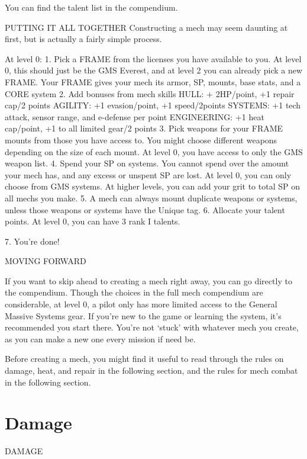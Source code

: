 You can find the talent list in the compendium.


                                   PUTTING IT ALL TOGETHER
Constructing a mech may seem daunting at first, but is actually a fairly simple process.

At level 0:
     1.  Pick a FRAME from the licenses you have available to you. At level 0, this should just be
         the GMS Everest, and at level 2 you can already pick a new FRAME. Your FRAME gives
         your mech its armor, SP, mounts, base stats, and a CORE system
    2.   Add bonuses from mech skills
                 HULL: + 2HP/point, +1 repair cap/2 points
                 AGILITY: +1 evasion/point, +1 speed/2points
                 SYSTEMS: +1 tech attack, sensor range, and e-defense per point
                 ENGINEERING: +1 heat cap/point, +1 to all limited gear/2 points
    3.   Pick weapons for your FRAME mounts from those you have access to. You might choose
         different weapons depending on the size of each mount. At level 0, you have access to
         only the GMS weapon list.
    4.   Spend your SP on systems. You cannot spend over the amount your mech has, and any
         excess or unspent SP are lost. At level 0, you can only choose from GMS systems. At
         higher levels, you can add your grit to total SP on all mechs you make.
    5.   A mech can always mount duplicate weapons or systems, unless those weapons or
         systems have the Unique tag.
    6.   Allocate your talent points. At level 0, you can have 3 rank I talents.

    7.   You’re done!





                                             MOVING FORWARD

If you want to skip ahead to creating a mech right away, you can go directly to the compendium.
Though the choices in the full mech compendium are considerable, at level 0, a pilot only has
more limited access to the General Massive Systems gear. If you’re new to the game or learning
the system, it’s recommended you start there. You’re not ‘stuck’ with whatever mech you create,
as you can make a new one every mission if need be.

Before creating a mech, you might find it useful to read through the rules on damage, heat, and
repair in the following section, and the rules for mech combat in the following section.

\section{Damage}
 DAMAGE

